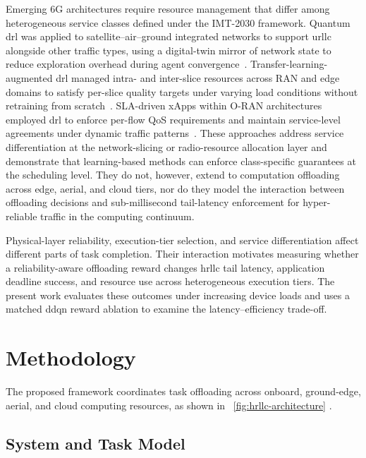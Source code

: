 \documentclass[journal]{IEEEtran}
\providecommand*{\algorithmautorefname}{Algorithm}
\providecommand*{\figureautorefname}{Figure}
\providecommand*{\subfigureautorefname}{Figure}
\providecommand*{\Autoref}[1]{%
  \begingroup
  \def\sectionautorefname{Section}%
  \def\subsectionautorefname{Subsection}%
  \def\subsubsectionautorefname{Subsubsection}%
  \def\algorithmautorefname{Algorithm}%
  \def\figureautorefname{Figure}%
  \def\subfigureautorefname{Figure}%
 ~\autoref{#1}%
  \endgroup
}
\newcommand{\Autoref}[1]{Eq.~\Autoref{#1}}
\begin{document}
Emerging 6G architectures require resource management that differ among heterogeneous service classes defined under the IMT-2030 framework. Quantum \ac{drl} was applied to satellite--air--ground integrated networks to support \ac{urllc} alongside other traffic types, using a digital-twin mirror of network state to reduce exploration overhead during agent convergence~\cite{RW07}. Transfer-learning-augmented \ac{drl} managed intra- and inter-slice resources across RAN and edge domains to satisfy per-slice quality targets under varying load conditions without retraining from scratch~\cite{RW09}. SLA-driven xApps within O-RAN architectures employed \ac{drl} to enforce per-flow QoS requirements and maintain service-level agreements under dynamic traffic patterns~\cite{RW10}. These approaches address service differentiation at the network-slicing or radio-resource allocation layer and demonstrate that learning-based methods can enforce class-specific guarantees at the scheduling level. They do not, however, extend to computation offloading across edge, aerial, and cloud tiers, nor do they model the interaction between offloading decisions and sub-millisecond tail-latency enforcement for hyper-reliable traffic in the computing continuum.


Physical-layer reliability, execution-tier selection, and service differentiation affect different parts of task completion. Their interaction motivates measuring whether a reliability-aware offloading reward changes \ac{hrllc} tail latency, application deadline success, and resource use across heterogeneous execution tiers. The present work evaluates these outcomes under increasing device loads and uses a matched \ac{ddqn} reward ablation to examine the latency--efficiency trade-off.



\section{Methodology}
\label{sec:methodology}

The proposed framework coordinates task offloading across onboard, ground-edge, aerial, and cloud computing resources, as shown in \Autoref{fig:hrllc-architecture}. 

\subsection{System and Task Model}
\label{subsec:system-task-model}
\end{document}
